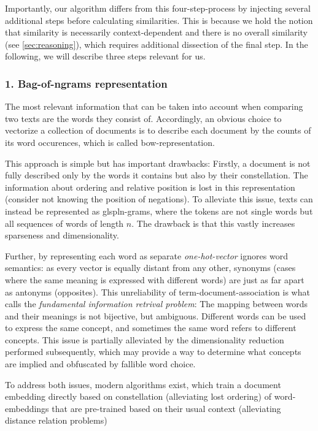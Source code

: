 Importantly, our algorithm differs from this four-step-process by injecting several additional steps before calculating similarities. This is because we hold the notion that similarity is necessarily context-dependent and there is no overall similarity (see \autoref{sec:reasoning}), which requires additional dissection of the final step. In the following, we will describe three steps relevant for us.


\subsubsection{1. Bag-of-ngrams representation}
\label{sec:techniques:bow}

The most relevant information that can be taken into account when comparing two texts are the words they consist of. Accordingly, an obvious choice to vectorize a collection of documents is to describe each document by the counts of its word occurences, which is called \gls{bow}-representation. 

This approach is simple but has important drawbacks: Firstly, a document is not fully described only by the words it contains but also by their constellation. The information about ordering and relative position is lost in this representation (consider not knowing the position of negations). To alleviate this issue, texts can instead be represented as glspl{n-grams}, where the tokens are not single words but all sequences of words of length $n$. The drawback is that this vastly increases sparseness and dimensionality.

Further, by representing each word as separate \textit{one-hot-vector} ignores word semantics: as every vector is equally distant from any other, synonyms (cases where the same meaning is expressed with different words) are just as far apart as antonyms (opposites). This unreliability of term-document-association is what \textcite{deerwester90} calls the \textit{fundamental information retrival problem}: The mapping between words and their meanings is not bijective, but ambiguous. Different words can be used to express the same concept, and sometimes the same word refers to different concepts. This issue is partially alleviated by the dimensionality reduction performed subsequently, which may provide a way to determine what concepts are implied and obfuscated by fallible word choice.

To address both issues, modern algorithms exist, which train a document embedding directly based on constellation (alleviating lost ordering) of word-embeddings that are pre-trained based on their usual context (alleviating distance relation problems)

